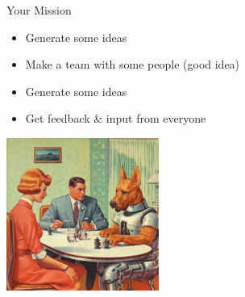 \documentclass[10pt]{beamer}
\begin{document}
\begin{frame}{Your Mission}
   	\begin{itemize}
	\item Generate some ideas
	\item Make a team with some people (good idea)
	\item Generate some ideas
	\item Get feedback \& input from everyone
	\end{itemize}
	\begin{center}
\includegraphics[height=5cm]{images/dog}
\end{center}
\end{frame}
\end{document}

